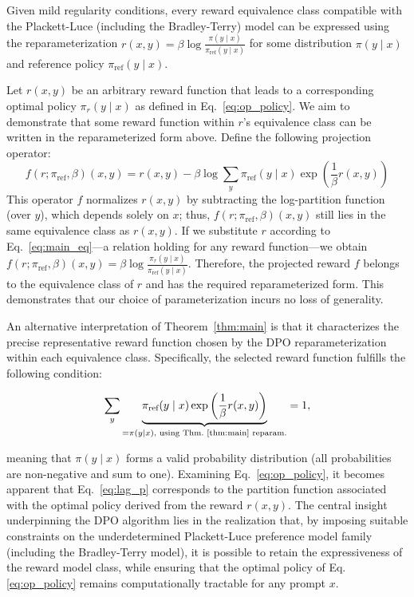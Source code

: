 \begin{theorem}\label{thm:main}
    Given mild regularity conditions, every reward equivalence class compatible with the Plackett-Luce (including the Bradley-Terry) model can be expressed using the reparameterization ${r(x, y) = \beta \log \frac{\pi(y\mid x)}{\pi_\text{ref}(y\mid x)}}$ for some distribution $\pi(y\mid x)$ and reference policy $\pi_\text{ref}(y \mid x)$.
\end{theorem}

\begin{sproof}
    Let $r(x, y)$ be an arbitrary reward function that leads to a corresponding optimal policy $\pi_r(y \mid x)$ as defined in Eq.~\ref{eq:op_policy}. We aim to demonstrate that some reward function within $r$'s equivalence class can be written in the reparameterized form above. Define the following projection operator:
\begin{equation}
    f(r; \pi_\text{ref}, \beta)(x, y) = r(x, y) - \beta\log\sum_{y}\pi_\text{ref}(y\mid x)\exp\left(\frac{1}{\beta}r(x, y)\right)
\end{equation}
This operator $f$ normalizes $r(x, y)$ by subtracting the log-partition function (over $y$), which depends solely on $x$; thus, $f(r; \pi_\text{ref}, \beta)(x, y)$ still lies in the same equivalence class as $r(x, y)$. If we substitute $r$ according to Eq.~\ref{eq:main_eq}—a relation holding for any reward function—we obtain $f(r; \pi_\text{ref}, \beta)(x, y) = \beta \log \frac{\pi_r(y\mid x)}{\pi_\text{ref}(y\mid x)}$. Therefore, the projected reward $f$ belongs to the equivalence class of $r$ and has the required reparameterized form. This demonstrates that our choice of parameterization incurs no loss of generality.
\end{sproof}

An alternative interpretation of Theorem~\ref{thm:main} is that it characterizes the precise representative reward function chosen by the DPO reparameterization within each equivalence class. Specifically, the selected reward function fulfills the following condition:

\begin{equation}\label{eq:lag_p}
     \sum_{y}\underbrace{\pi_\text{ref}(y\mid x)\exp\left(\frac{1}{\beta}r(x, y)\right)}_{=\pi(y\mid x)\text{, using Thm.~\ref{thm:main} reparam.}} = 1,
\end{equation}

meaning that $\pi(y\mid x)$ forms a valid probability distribution (all probabilities are non-negative and sum to one). Examining Eq.~\ref{eq:op_policy}, it becomes apparent that Eq.~\ref{eq:lag_p} corresponds to the partition function associated with the optimal policy derived from the reward $r(x, y)$. The central insight underpinning the DPO algorithm lies in the realization that, by imposing suitable constraints on the underdetermined Plackett-Luce preference model family (including the Bradley-Terry model), it is possible to retain the expressiveness of the reward model class, while ensuring that the optimal policy of Eq. \ref{eq:op_policy} remains computationally tractable for any prompt $x$.

